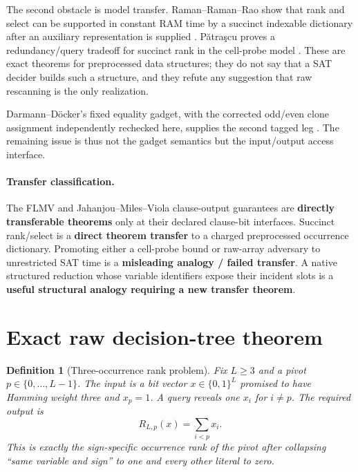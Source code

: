 \documentclass[11pt]{article}
\newtheorem{definition}{Definition}
\begin{document}
The second obstacle is model transfer.  Raman--Raman--Rao show that rank and
select can be supported in constant RAM time by a succinct indexable
dictionary after an auxiliary representation is supplied \cite{rrr}.
P\u{a}tra\c{s}cu proves a redundancy/query tradeoff for succinct rank in the
cell-probe model \cite{patrascu}.  These are exact theorems for preprocessed
data structures; they do not say that a SAT decider builds such a structure,
and they refute any suggestion that raw rescanning is the only realization.

Darmann--D\"ocker's fixed equality gadget, with the corrected odd/even clone
assignment independently rechecked here, supplies the second tagged leg
\cite{dd}.  The remaining issue is thus not the gadget semantics but the
input/output access interface.

\paragraph{Transfer classification.}
The FLMV and Jahanjou--Miles--Viola clause-output guarantees are
\textbf{directly transferable theorems} only at their declared clause-bit
interfaces.  Succinct rank/select is a \textbf{direct theorem transfer} to
a charged preprocessed occurrence dictionary.  Promoting either a cell-probe
bound or raw-array adversary to unrestricted SAT time is a
\textbf{misleading analogy / failed transfer}.  A native structured reduction
whose variable identifiers expose their incident slots is a
\textbf{useful structural analogy requiring a new transfer theorem}.

\section{Exact raw decision-tree theorem}

\begin{definition}[Three-occurrence rank problem]
Fix $L\ge3$ and a pivot $p\in\{0,\ldots,L-1\}$.  The input is a bit vector
$x\in\{0,1\}^L$ promised to have Hamming weight three and $x_p=1$.  A query
reveals one $x_i$ for $i\ne p$.  The required output is
\[
 R_{L,p}(x)=\sum_{i<p}x_i.
\]
This is exactly the sign-specific occurrence rank of the pivot after
collapsing ``same variable and sign'' to one and every other literal to zero.
\end{definition}
\end{document}
